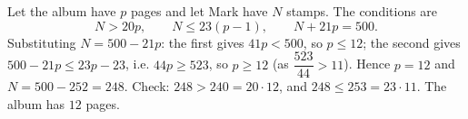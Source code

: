 Let the album have $p$ pages and let Mark have $N$ stamps. The conditions are
\[N>20p,\qquad N\le23(p-1),\qquad N+21p=500.\]
Substituting $N=500-21p$: the first gives $41p<500$, so $p\le12$; the second gives $500-21p\le23p-23$, i.e. $44p\ge523$, so $p\ge12$ (as $\dfrac{523}{44}>11$). Hence $p=12$ and $N=500-252=248$. Check: $248>240=20\cdot12$, and $248\le253=23\cdot11$. The album has $\boxed{12}$ pages.
